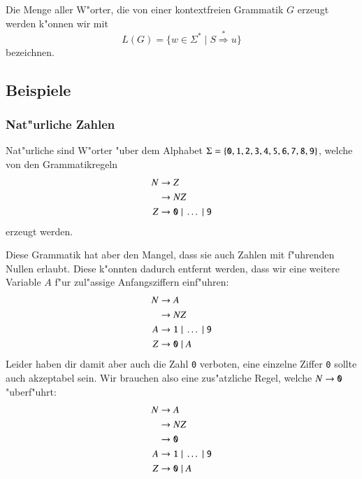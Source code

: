 \begin{definition}
Die Menge aller W"orter, die von einer kontextfreien Grammatik 
$G$ erzeugt werden k"onnen wir mit
\[
L(G)=\{w\in\Sigma^*\;|\; S\overset{*}{\Rightarrow} u\}
\]
bezeichnen.
\end{definition}

\subsection{Beispiele}
\subsubsection{Nat"urliche Zahlen}
Nat"urliche sind W"orter "uber dem Alphabet $\Sigma=\{
{\tt 0},
{\tt 1},
{\tt 2},
{\tt 3},
{\tt 4},
{\tt 5},
{\tt 6},
{\tt 7},
{\tt 8},
{\tt 9}\}$, welche von den Grammatikregeln
\begin{align*}
N&\to Z\\
 &\to NZ\\
Z&\to {\tt 0}\;|\;\dots \;|\;{\tt 9}
\end{align*}
erzeugt werden.

Diese Grammatik hat aber den Mangel, dass sie auch Zahlen
mit f"uhrenden Nullen erlaubt. Diese k"onnten dadurch entfernt
werden, dass wir eine weitere Variable $A$ f"ur zul"assige
Anfangsziffern einf"uhren:
\begin{align*}
N&\to A\\
 &\to NZ\\
A&\to {\tt 1}\;|\;\dots\;|\;{\tt 9}\\
Z&\to {\tt 0}\;|\; A
\end{align*}
Leider haben dir damit aber auch die Zahl {\tt 0} verboten,
eine einzelne Ziffer {\tt 0} sollte auch akzeptabel sein.
Wir brauchen also eine zus"atzliche Regel, welche $N\to{\tt 0}$
"uberf"uhrt:
\begin{align*}
N&\to A\\
 &\to NZ\\
 &\to {\tt 0}\\
A&\to {\tt 1}\;|\;\dots\;|\;{\tt 9}\\
Z&\to {\tt 0}\;|\; A
\end{align*}
